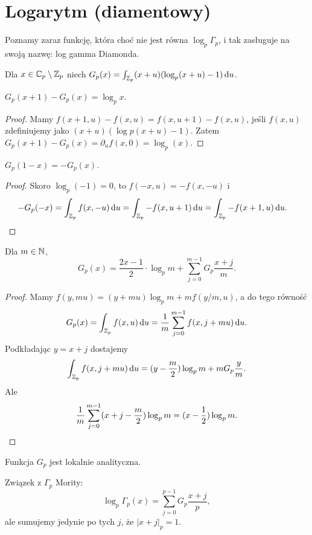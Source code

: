 \section{Logarytm (diamentowy)}
Poznamy  zaraz funkcję, która choć nie jest równa $\log_p \Gamma_p$, i tak zasługuje na swoją nazwę: log gamma Diamonda.

\begin{definicja}
	Dla $x \in \mathbb C_p \setminus \mathbb Z_p$ niech $G_p(x) = \int_{\mathbb Z_p} (x+u) (\log_p (x+u) - 1) \,\textrm{d}u$.
\end{definicja}

\begin{fakt}
	$G_p(x+1) - G_p(x) = \log_p x$.
\end{fakt}

\begin{proof}
	Mamy $f(x + 1, u) - f(x, u) = f(x, u + 1) - f(x, u)$, jeśli $f(x, u)$ zdefiniujemy jako	$(x+u)(\log p(x+u) - 1)$.
	Zatem $G_p(x+1) - G_p(x) = \partial_uf(x, 0) = \log_p(x)$.
\end{proof}

\begin{fakt}
	$G_p(1-x) = - G_p(x)$.
\end{fakt}

\begin{proof}
	Skoro $\log_p(-1) = 0$, to $f(-x, u) = - f(x, -u)$ i 
	\begin{align*}
		- G_p (-x) & = \int_{\mathbb Z_p} f(x, -u) \,\textrm{d}u
		= \int_{\mathbb Z_p} -f(x, u+1) \,\textrm{d}u =  \int_{\mathbb Z_p} -f(x+1, u) \,\textrm{d}u. \qedhere
	\end{align*}
\end{proof}

\begin{fakt}
	Dla $m \in \mathbb N$,
	\[
		G_p(x) = \frac{2x-1}{2} \cdot \log_p m + \sum_{j=0}^{m-1} G_p \frac{x+j}{m}.
	\]
\end{fakt}

\begin{proof}
	Mamy $f(y, mu) = (y + mu) \log_p m + m f(y/m, u)$, a do tego równość
	\[
		G_p(x) = \int_{\mathbb Z_p} f(x, u) \,\textrm{d}u = \frac 1m \sum_{j = 0}^{m-1} f(x, j+mu) \,\textrm{d}u.
	\]
	Podkładając $y = x+j$ dostajemy
	\[
		\int_{\mathbb Z_p} f(x, j + mu) \,\textrm{d} u = (y - \frac m 2) \log_p m + m G_p \frac{y}{m}.
	\]
	Ale
	\[
		\frac 1m \sum_{j=0}^{m-1} (x + j - \frac m2) \log_pm = (x - \frac 12) \log_p m. \qedhere
	\]
\end{proof}

\begin{fakt}
	Funkcja $G_p$ jest lokalnie analityczna.
\end{fakt}

\begin{fakt}
	Związek z $\Gamma_p$ Mority:
	\[
		\log_p \Gamma_p (x) = \sum_{j=0}^{p-1} G_p \frac{x+j}{p},
	\]
	ale sumujemy jedynie po tych $j$, że $|x + j|_p = 1$.
\end{fakt}